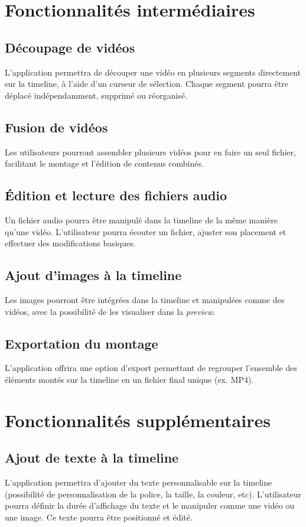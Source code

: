 \documentclass{rapport}
\begin{document}
\section{Fonctionnalités intermédiaires}

\subsection{Découpage de vidéos}
L’application permettra de découper une vidéo en plusieurs segments directement sur la timeline, à l’aide d’un curseur de sélection. Chaque segment pourra être déplacé indépendamment, supprimé ou réorganisé.

\subsection{Fusion de vidéos}
Les utilisateurs pourront assembler plusieurs vidéos pour en faire un seul fichier, facilitant le montage et l’édition de contenus combinés.

\subsection{Édition et lecture des fichiers audio}
Un fichier audio pourra être manipulé dans la timeline de la même manière qu’une vidéo. L’utilisateur pourra écouter un fichier, ajuster son placement et effectuer des modifications basiques.

\subsection{Ajout d’images à la timeline}
Les images pourront être intégrées dans la timeline et manipulées comme des vidéos, avec la possibilité de les visualiser dans la \textit{preview}.

\subsection{Exportation du montage}
L’application offrira une option d’export permettant de regrouper l’ensemble des éléments montés sur la timeline en un fichier final unique (ex. MP4). 

\section{Fonctionnalités supplémentaires}
\subsection{Ajout de texte à la timeline}
L’application permettra d’ajouter du texte personnalisable sur la timeline (possibilité de personnalisation de la police, la taille, la couleur, etc). L’utilisateur pourra définir la durée d’affichage du texte et le manipuler comme une vidéo ou une image. Ce texte pourra être positionné et édité.
\end{document}
